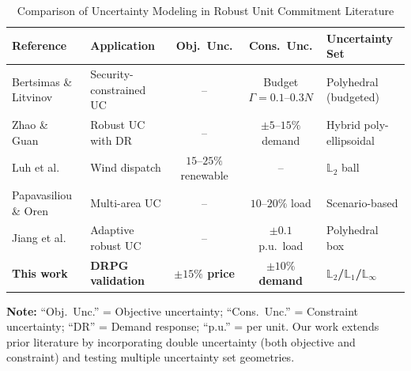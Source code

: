 
\begin{table}[t]
\centering
\caption{Comparison of Uncertainty Modeling in Robust Unit Commitment Literature}
\label{tab:literature_comparison}
\small  %
\begin{tabular}{lp{2.5cm}ccp{3.5cm}}
\toprule
\textbf{Reference} & \textbf{Application} & \textbf{Obj.\ Unc.} & \textbf{Cons.\ Unc.} & \textbf{Uncertainty Set} \\
\midrule
Bertsimas \& Litvinov~\cite{BertsimasLitvinov2012}
  & Security-constrained UC & -- & Budget $\Gamma = 0.1$--$0.3N$ & Polyhedral (budgeted) \\
\midrule
Zhao \& Guan~\cite{ZhaoGuan2013}
  & Robust UC with DR & -- & $\pm 5$--$15\%$ demand & Hybrid poly-ellipsoidal \\
\midrule
Luh et al.~\cite{Luh2015}
  & Wind dispatch & $15$--$25\%$ renewable & -- & $\mathbb{L}_2$ ball \\
\midrule
Papavasiliou \& Oren~\cite{PapavasiliouOren2013}
  & Multi-area UC & -- & $10$--$20\%$ load & Scenario-based \\
\midrule
Jiang et al.~\cite{JiangUC2012}
  & Adaptive robust UC & -- & $\pm 0.1$ p.u.\ load & Polyhedral box \\
\midrule
\textbf{This work}
  & \textbf{DRPG validation} & \textbf{$\pm 15\%$ price} & \textbf{$\pm 10\%$ demand} & \textbf{$\mathbb{L}_2$/$\mathbb{L}_1$/$\mathbb{L}_\infty$} \\
\bottomrule
\end{tabular}
\vspace{2mm}
\parbox{\textwidth}{\footnotesize
\textbf{Note:} ``Obj.\ Unc.'' = Objective uncertainty; ``Cons.\ Unc.'' = Constraint uncertainty;
``DR'' = Demand response; ``p.u.'' = per unit. Our work extends prior literature by incorporating
double uncertainty (both objective and constraint) and testing multiple uncertainty set geometries.
}
\end{table}

